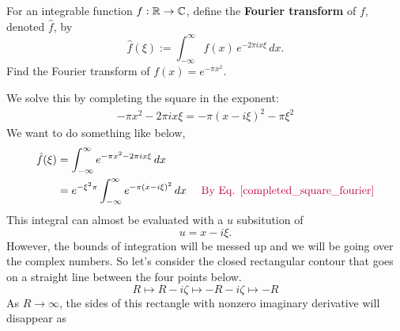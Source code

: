 \documentclass{homework}
\begin{document}
                                  \begin{problem}
                                    For an integrable function $f : \mathbb{R} \to \mathbb{C}$, define the
                                      \textbf{Fourier transform} of $f$, denoted $\hat{f}$, by
                                        \[
                                            {\hat {f}}(\xi ) := \int _{-\infty }^{\infty} f(x) \, e^{-2\pi ix \xi} \,dx.
                                              \]
                                                Find the Fourier transform of $f(x) = e^{-\pi x^2}$.
                                                \end{problem}
                                                \begin{solution}
                                                We solve this by completing the square in the exponent:
                                                \begin{align}\label{completed_square_fourier}
                                                -\pi x^2 - 2\pi ix\xi = -\pi(x-i\xi)^2 - \pi \xi^2
                                                \end{align}
                                                We want to do something like below,
                                                \begin{align*}
                                                {\hat {f}}(\xi ) &=  \int _{-\infty }^{\infty} e^{-\pi x^2 -2\pi ix \xi} \,dx\\
                                                &=  e^{-\xi^2\pi}\int _{-\infty }^{\infty} e^{-\pi (x-i\xi)^2} \,dx\quad \color{purple} \text{ By Eq. \ref{completed_square_fourier}}
                                                \end{align*}
                                                This integral can almost be evaluated with a $u$ subsitution of 
                                                \[u = x-i\xi.\]
                                                However, the bounds of integration will be messed up and we will be going over the complex numbers. So let's consider the closed rectangular contour that goes on a straight line between the four points below.
                                                \[R \mapsto R - i\zeta \mapsto - R - i\zeta \mapsto -R\]
                                                As $R\to\infty$, the sides of this rectangle with nonzero imaginary derivative will disappear as
                                                \[
\]
\end{solution}
\end{document}
